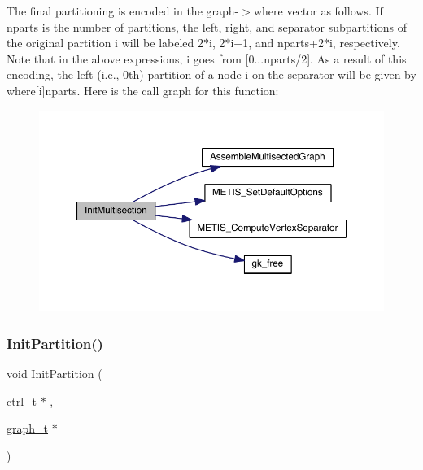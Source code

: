 The final partitioning is encoded in the graph-\/$>$where vector as follows. If nparts is the number of partitions, the left, right, and separator subpartitions of the original partition i will be labeled 2$\ast$i, 2$\ast$i+1, and nparts+2$\ast$i, respectively. Note that in the above expressions, i goes from \mbox{[}0...nparts/2\mbox{]}. As a result of this encoding, the left (i.\+e., 0th) partition of a node {\ttfamily i} on the separator will be given by where\mbox{[}i\mbox{]}nparts. Here is the call graph for this function\+:\nopagebreak
\begin{figure}[H]
\begin{center}
\leavevmode
\includegraphics[width=350pt]{a00951_ae5b482d2dc0a65057e8d69e57773279a_cgraph}
\end{center}
\end{figure}
\mbox{\label{a00951_a5358042c354702d9e8128f7cc342a322}} 
\subsubsection{\texorpdfstring{Init\+Partition()}{InitPartition()}}
{\footnotesize\ttfamily void Init\+Partition (\begin{DoxyParamCaption}\item[{\hyperlink{a00742}{ctrl\+\_\+t} $\ast$}]{,  }\item[{\hyperlink{a00734}{graph\+\_\+t} $\ast$}]{ }\end{DoxyParamCaption})}

